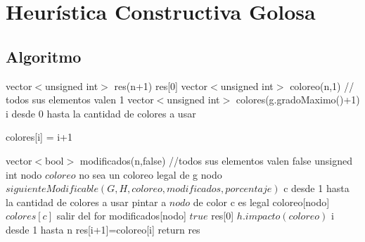 \section{Heurística Constructiva Golosa}

\subsection{Algoritmo}

\begin{algorithm}[H]
\caption{} 
\begin{codebox}
\li
\li	vector$<$unsigned int$>$ res(n+1)
\li res[0] 
\li
\li vector$<$unsigned int$>$ coloreo(n,1) // todos sus elementos valen 1
\li vector$<$unsigned int$>$ colores(g.gradoMaximo()+1) 
\li
\li \For i desde 0 hasta la cantidad de colores a usar \Do

\li 		colores[i] = i+1
 	\End

\li
\li vector$<$bool$>$ modificados(n,false) //todos sus elementos valen false
\li unsigned int nodo
\li
\li \While $coloreo$ no sea un coloreo legal de g \Do
\li
\li 	nodo \gets $siguienteModificable(G,H,coloreo,modificados,porcentaje)$
\li
\li     \For c desde 1 hasta la cantidad de colores a usar \Do
\li 				  	
\li  			\If pintar a $nodo$ de color c es legal \Do
\li 					coloreo[nodo] \gets $colores[c]$
\li 					salir del for
				\End
\li
		\End
\li 	modificados[nodo] \gets $true$
\li
	\End
\li
\li res[0] \gets $h.impacto(coloreo)$
\li
\li \For i desde 1 hasta n \Do
\li 	res[i+1]=coloreo[i]
\li \End
\li
\li return res
	
\End
\end{codebox}
\end{algorithm}


